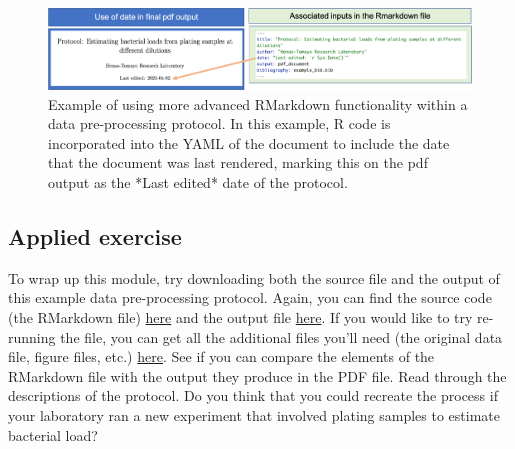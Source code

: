 \documentclass[]{tufte-book}
\begin{document}
\begin{figure}
\includegraphics[width=\textwidth]{figures/protocol_yaml_date} \caption[Example of using more advanced RMarkdown functionality within a data pre-processing protocol]{Example of using more advanced RMarkdown functionality within a data pre-processing protocol. In this example, R code is incorporated into the YAML of the document to include the date that the document was last rendered, marking this on the pdf output as the *Last edited* date of the protocol.}\label{fig:protocolyaml}
\end{figure}

\subsection{Applied exercise}\label{applied-exercise-1}

To wrap up this module, try downloading both the source file and the output of this example
data pre-processing protocol. Again, you can find the source code (the RMarkdown file)
\href{https://raw.githubusercontent.com/geanders/improve_repro/master/data/bactcountr_example_data/example_protocol.Rmd}{here} and the output file \href{https://github.com/geanders/improve_repro/raw/master/data/bactcountr_example_data/example_protocol.pdf}{here}. If you would like to try re-running the file, you can get all the additional files
you'll need (the original data file, figure files, etc.) \href{https://github.com/geanders/improve_repro/tree/master/data/bactcountr_example_data}{here}. See if
you can compare the elements of the RMarkdown file with the output they produce in the
PDF file. Read through the descriptions of the protocol. Do you think that you could recreate
the process if your laboratory ran a new experiment that involved plating samples to
estimate bacterial load?


\end{document}
